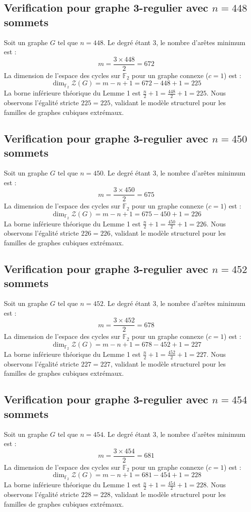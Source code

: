 \documentclass[11pt,a4paper]{article}
\begin{document}
\subsection{Verification pour graphe 3-regulier avec $n=448$ sommets}
Soit un graphe $G$ tel que $n = 448$. Le degré étant 3, le nombre d'arêtes minimum est :
$$ m = \frac{3 \times 448}{2} = 672 $$
La dimension de l'espace des cycles sur $\mathbb{F}_2$ pour un graphe connexe ($c=1$) est :
$$ \dim_{\mathbb{F}_2} \mathcal{Z}(G) = m - n + 1 = 672 - 448 + 1 = 225 $$
La borne inférieure théorique du Lemme 1 est $\frac{n}{2} + 1 = \frac{448}{2} + 1 = 225$.
Nous observons l'égalité stricte $225 = 225$, validant le modèle structurel pour les familles de graphes cubiques extrémaux.

\subsection{Verification pour graphe 3-regulier avec $n=450$ sommets}
Soit un graphe $G$ tel que $n = 450$. Le degré étant 3, le nombre d'arêtes minimum est :
$$ m = \frac{3 \times 450}{2} = 675 $$
La dimension de l'espace des cycles sur $\mathbb{F}_2$ pour un graphe connexe ($c=1$) est :
$$ \dim_{\mathbb{F}_2} \mathcal{Z}(G) = m - n + 1 = 675 - 450 + 1 = 226 $$
La borne inférieure théorique du Lemme 1 est $\frac{n}{2} + 1 = \frac{450}{2} + 1 = 226$.
Nous observons l'égalité stricte $226 = 226$, validant le modèle structurel pour les familles de graphes cubiques extrémaux.

\subsection{Verification pour graphe 3-regulier avec $n=452$ sommets}
Soit un graphe $G$ tel que $n = 452$. Le degré étant 3, le nombre d'arêtes minimum est :
$$ m = \frac{3 \times 452}{2} = 678 $$
La dimension de l'espace des cycles sur $\mathbb{F}_2$ pour un graphe connexe ($c=1$) est :
$$ \dim_{\mathbb{F}_2} \mathcal{Z}(G) = m - n + 1 = 678 - 452 + 1 = 227 $$
La borne inférieure théorique du Lemme 1 est $\frac{n}{2} + 1 = \frac{452}{2} + 1 = 227$.
Nous observons l'égalité stricte $227 = 227$, validant le modèle structurel pour les familles de graphes cubiques extrémaux.

\subsection{Verification pour graphe 3-regulier avec $n=454$ sommets}
Soit un graphe $G$ tel que $n = 454$. Le degré étant 3, le nombre d'arêtes minimum est :
$$ m = \frac{3 \times 454}{2} = 681 $$
La dimension de l'espace des cycles sur $\mathbb{F}_2$ pour un graphe connexe ($c=1$) est :
$$ \dim_{\mathbb{F}_2} \mathcal{Z}(G) = m - n + 1 = 681 - 454 + 1 = 228 $$
La borne inférieure théorique du Lemme 1 est $\frac{n}{2} + 1 = \frac{454}{2} + 1 = 228$.
Nous observons l'égalité stricte $228 = 228$, validant le modèle structurel pour les familles de graphes cubiques extrémaux.
\end{document}
